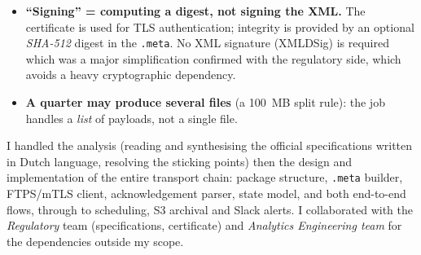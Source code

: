 \begin{itemize}
  \item \textbf{``Signing'' = computing a digest, not signing the XML.} The certificate is used for TLS authentication; integrity is provided by an optional \emph{SHA-512} digest in the \texttt{.meta}. No XML signature (XMLDSig) is required which was a major simplification confirmed with the regulatory side, which avoids a heavy cryptographic dependency.
  \item \textbf{A quarter may produce several files} (a 100~MB split rule): the job handles a \emph{list} of payloads, not a single file.
\end{itemize}


\begin{contribbox}
I handled the analysis (reading and synthesising the official specifications written in Dutch language, resolving the sticking points) then the design and implementation of the entire transport chain: package structure, \texttt{.meta} builder, FTPS/mTLS client, acknowledgement parser, state model, and both end-to-end flows, through to scheduling, S3 archival and Slack alerts. I collaborated with the \emph{Regulatory} team (specifications, certificate) and \emph{Analytics Engineering team} for the dependencies outside my scope.
\end{contribbox}
